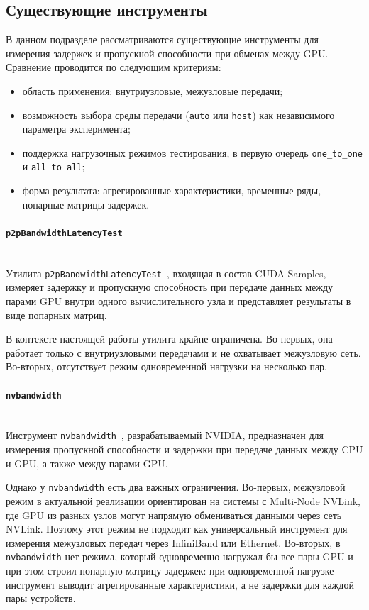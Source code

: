 \documentclass[a4paper,14pt]{extarticle}
\begin{document}
\subsection{Существующие инструменты}

В данном подразделе рассматриваются существующие инструменты для измерения задержек и пропускной способности при обменах между GPU. Сравнение проводится по следующим критериям:

\begin{itemize}
	\item область применения: внутриузловые, межузловые передачи;
	\item возможность выбора среды передачи (\texttt{auto} или \texttt{host}) как независимого параметра эксперимента;
	\item поддержка нагрузочных режимов тестирования, в первую очередь \texttt{one\_to\_one} и \texttt{all\_to\_all};
	\item форма результата: агрегированные характеристики, временные ряды, попарные матрицы задержек.
\end{itemize}

\paragraph{\texttt{p2pBandwidthLatencyTest}}\mbox{}\\
\indent Утилита \texttt{p2pBandwidthLatencyTest}~\cite{p2p}, входящая в состав CUDA Samples, измеряет задержку и пропускную способность при передаче данных между парами GPU внутри одного вычислительного узла и представляет результаты в виде попарных матриц.

В контексте настоящей работы утилита крайне ограничена. Во-первых, она работает только с внутриузловыми передачами и не охватывает межузловую сеть. Во-вторых, отсутствует режим одновременной нагрузки на несколько пар.

\paragraph{\texttt{nvbandwidth}}\mbox{}\\
\indent Инструмент \texttt{nvbandwidth}~\cite{nvbandwidth}, разрабатываемый NVIDIA, предназначен для измерения пропускной способности и задержки при передаче данных между CPU и GPU, а также между парами GPU.

Однако у \texttt{nvbandwidth} есть два важных ограничения. Во-первых, межузловой режим в актуальной реализации ориентирован на системы с Multi-Node NVLink, где GPU из разных узлов могут напрямую обмениваться данными через сеть NVLink. Поэтому этот режим не подходит как универсальный инструмент для измерения межузловых передач через InfiniBand или Ethernet. Во-вторых, в \texttt{nvbandwidth} нет режима, который одновременно нагружал бы все пары GPU и при этом строил попарную матрицу задержек: при одновременной нагрузке инструмент выводит агрегированные характеристики, а не задержки для каждой пары устройств.
\end{document}
